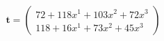 \documentclass[preview]{standalone}
\begin{document}
\begin{align*}
\mathbf{t} = \begin{pmatrix}72 + 118x^{1} + 103x^{2} + 72x^{3} \\ 118 + 16x^{1} + 73x^{2} + 45x^{3}\end{pmatrix}
\end{align*}
\end{document}

